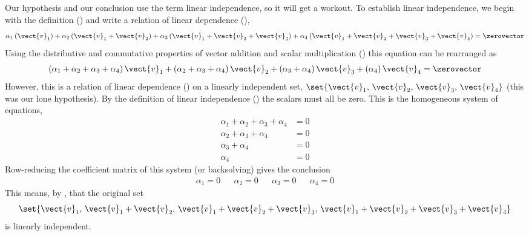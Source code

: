Our hypothesis and our conclusion use the term linear independence, so it will get a workout.  To establish linear independence, we begin with the definition () and write a relation of linear dependence (),
%
\begin{equation*}
\alpha_1\left(\vect{v}_1\right)+
\alpha_2\left(\vect{v}_1+\vect{v}_2\right)+
\alpha_3\left(\vect{v}_1+\vect{v}_2+\vect{v}_3\right)+
\alpha_4\left(\vect{v}_1+\vect{v}_2+\vect{v}_3+\vect{v}_4\right)
=\zerovector
\end{equation*}
%
Using the distributive and commutative properties of vector addition and scalar multiplication () this equation can be rearranged as
%
\begin{equation*}
\left(\alpha_1+\alpha_2+\alpha_3+\alpha_4\right)\vect{v}_1+
\left(\alpha_2+\alpha_3+\alpha_4\right)\vect{v}_2+
\left(\alpha_3+\alpha_4\right)\vect{v}_3+
\left(\alpha_4\right)\vect{v}_4
=
\zerovector
\end{equation*}
%
However, this is a relation of linear dependence () on a linearly independent set, $\set{\vect{v}_1,\,\vect{v}_2,\,\vect{v}_3,\,\vect{v}_4}$ (this was our lone hypothesis).  By the definition of linear independence () the scalars must all be zero.  This is the homogeneous system of equations,
%
\begin{align*}
\alpha_1+\alpha_2+\alpha_3+\alpha_4&=0\\
\alpha_2+\alpha_3+\alpha_4&=0\\
\alpha_3+\alpha_4&=0\\
\alpha_4&=0
\end{align*}
%
Row-reducing the coefficient matrix of this system (or backsolving) gives the conclusion
%
%
\begin{align*}
\alpha_1=0&&\alpha_2=0&&\alpha_3=0&&\alpha_4=0
\end{align*}
%
This means, by , that the original set
%
\begin{equation*}
\set{
\vect{v}_1,\,
\vect{v}_1+\vect{v}_2,\,
\vect{v}_1+\vect{v}_2+\vect{v}_3,\,
\vect{v}_1+\vect{v}_2+\vect{v}_3+\vect{v}_4
}
\end{equation*}
%
is linearly independent.
